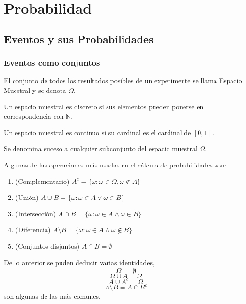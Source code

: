 \part{Probabilidad}

\chapter{Eventos y sus Probabilidades}
\section{Eventos como conjuntos}


\begin{defn}
El conjunto de todos los resultados posibles de un experimente se llama Espacio Muestral y se denota $\Omega$.
\end{defn}

\begin{obs}
Un espacio muestral es discreto si sus elementos pueden ponerse en correspondencia con $\mathbb{N}$.
\end{obs}

\begin{obs}
Un espacio muestral es continuo si su cardinal es el cardinal de $[0,1]$.
\end{obs}

\begin{defn}[Suceso]
Se denomina suceso a cualquier subconjunto del espacio muestral $\Omega$.
\end{defn}

\begin{defn}[Operaciones]
Algunas de las operaciones más usadas en el cálculo de probabilidades son:
\begin{enumerate}[label=(\roman*)]
    \item (Complementario) $A^c = \{\omega:\omega\in \Omega, \omega\not\in A\}$
    \item (Unión) $A\cup B = \{\omega:\omega\in A \lor \omega \in B\}$
    \item (Intersección)  $A\cap B = \{\omega:\omega\in A \land \omega \in B\}$
    \item (Diferencia) $A\setminus B = \{\omega:\omega\in A \land \omega \not\in B\}$
    \item (Conjuntos disjuntos) $A\cap B = \emptyset$
\end{enumerate}
\end{defn}
\begin{obs}
De lo anterior se puden deducir varias identidades, 
\[ \Omega^c = \emptyset \]
\[ \Omega \cup A = \Omega \]
\[ A \cup A^c = \Omega \]
\[ A\setminus B = A\cap B^c \]
son algunas de las más comunes.
\end{obs}

